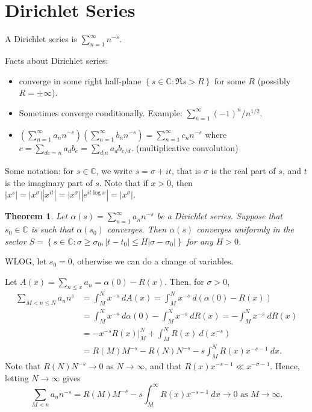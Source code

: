 \documentclass[11pt]{article}
\newtheorem{thm}{Theorem}[section]
\theoremstyle{definition}
\newcommand{\set}[1]{\left\{ #1 \right\}}
\newcommand{\abs}[1]{\left\lvert#1\right\rvert} %
\newcommand{\CC}{\mathbb{C}}
\begin{document}

\section{Dirichlet Series}

A Dirichlet series is $\sum_{n=1}^\infty n^{-s}$.

Facts about Dirichlet series:
\begin{itemize}
\item converge in some right half-plane $\set{s\in\CC:\Re s>R}$ for some $R$ (possibly
$R=\pm\infty$).
\item Sometimes converge conditionally. Example: $\sum_{n=1}^\infty(-1)^n/n^{1/2}$.
\item $\left(\sum_{n=1}^\infty a_nn^{-s}\right)\left(\sum_{n=1}^\infty b_nn^{-s}\right)
= \sum_{n=1}^\infty c_nn^{-s}$ where $c=\sum_{de=n}a_db_e=\sum_{d|n}a_db_{e/d}$.
(multiplicative convolution)
\end{itemize}

Some notation: for $s\in\CC$, we write $s=\sigma+it$, that is $\sigma$ is the real part of
$s$, and $t$ is the imaginary part of $s$. Note that if $x>0$, then
$\abs{x^s}=\abs{x^\sigma}\abs{x^{it}}=\abs{x^\sigma}\abs{e^{it\log{x}}}=\abs{x^\sigma}$.

\begin{thm}
Let $\alpha(s)=\sum_{n=1}^\infty a_nn^{-s}$ be a Dirichlet series. Suppose that
$s_0\in\CC$ is such that $\alpha(s_0)$ converges. Then $\alpha(s)$ converges uniformly in
the sector $S=\set{s\in\CC:\sigma\ge\sigma_0,\abs{t-t_0}\le H\abs{\sigma-\sigma_0}}$ for
any $H>0$.
\end{thm}

\proof
WLOG, let $s_0=0$, otherwise we can do a change of variables.

Let $A(x)=\sum_{n\le x}a_n=\alpha(0)-R(x)$. Then, for $\sigma>0$,
\begin{align*}
\sum_{M<n\le N}a_n n^s &= \int_M^N x^{-s} ~dA(x) = \int_M^N x^{-s} ~d(\alpha(0)-R(x)) \\
&= \int_M^N x^{-s} ~d\alpha(0) - \int_M^N x^{-s} ~dR(x) = -\int_M^N x^{-s} ~dR(x) \\
&= \left.-x^{-s}R(x)\right|_M^N + \int_M^N R(x) ~d(x^{-s}) \\
&= R(M)M^{-s} - R(N)N^{-s} - s\int_M^N R(x)x^{-s-1} ~dx .
\end{align*}
Note that $R(N)N^{-s}\to0$ as $N\to\infty$, and that $R(x)x^{-s-1}\ll x^{-\sigma-1}$.
Hence, letting $N\to\infty$ gives
\[
  \sum_{M<n}a_nn^{-s} = R(M)M^{-s} - s\int_M^\infty R(x)x^{-s-1} ~dx
  \to 0 \text{ as } M \to \infty .
\]
\end{document}
